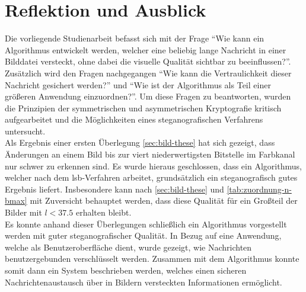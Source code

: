 \chapter{Reflektion und Ausblick}
Die vorliegende Studienarbeit befasst sich mit der Frage \enquote{Wie kann
  ein Algorithmus entwickelt werden, welcher eine beliebig lange Nachricht
  in einer Bilddatei versteckt, ohne dabei die visuelle Qualität sichtbar zu beeinflussen?}.
Zusätzlich wird den Fragen nachgegangen \enquote{Wie kann die Vertraulichkeit dieser Nachricht
  gesichert werden?} und \enquote{Wie ist der Algorithmus als Teil einer
  größeren Anwendung einzuordnen?}. Um diese Fragen zu beantworten, wurden die
Prinzipien der symmetrischen und asymmetrischen Kryptografie kritisch aufgearbeitet
und die Möglichkeiten eines steganografischen Verfahrens untersucht.\\[8pt]
Als Ergebnis einer ersten Überlegung \eqref{sec:bild-these} hat sich gezeigt,
dass Änderungen an einem Bild bis zur viert niederwertigsten Bitstelle im Farbkanal nur
schwer zu erkennen sind. Es wurde hieraus geschlossen, dass ein
Algorithmus, welcher nach dem \acs{lsb}-Verfahren arbeitet,
grundsätzlich ein steganografisch gutes Ergebnis liefert.
Insbesondere kann nach \eqref{sec:bild-these} und \autoref{tab:zuordnung-n-bmax}
mit Zuversicht behauptet werden, dass diese Qualität für
ein Großteil der Bilder mit $l < \num{37.5}$ erhalten bleibt.\\[8pt]
Es konnte anhand dieser Überlegungen schließlich ein Algorithmus vorgestellt werden
mit guter steganografischer Qualität.
In Bezug auf eine Anwendung, welche als Benutzeroberfläche dient, wurde gezeigt, wie
Nachrichten benutzergebunden verschlüsselt werden.
Zusammen mit dem Algorithmus konnte somit dann ein System beschrieben werden, welches einen
sicheren Nachrichtenaustausch über in Bildern versteckten Informationen ermöglicht.

